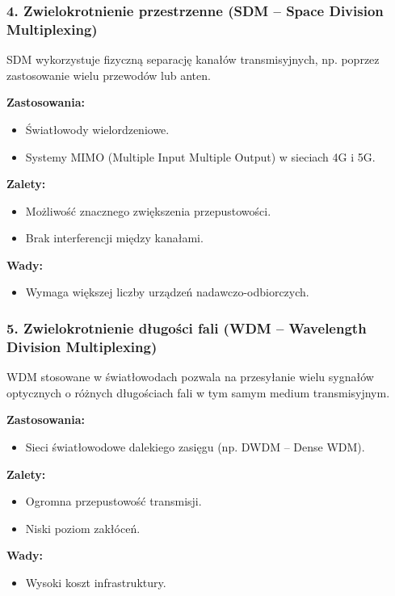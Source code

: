 \subsubsection{4. Zwielokrotnienie przestrzenne (SDM – Space Division Multiplexing)}
SDM wykorzystuje fizyczną separację kanałów transmisyjnych, np. poprzez zastosowanie wielu przewodów lub anten.

\textbf{Zastosowania:}
\begin{itemize}
    \item Światłowody wielordzeniowe.
    \item Systemy MIMO (Multiple Input Multiple Output) w sieciach 4G i 5G.
\end{itemize}

\textbf{Zalety:}
\begin{itemize}
    \item Możliwość znacznego zwiększenia przepustowości.
    \item Brak interferencji między kanałami.
\end{itemize}

\textbf{Wady:}
\begin{itemize}
    \item Wymaga większej liczby urządzeń nadawczo-odbiorczych.
\end{itemize}

\subsubsection{5. Zwielokrotnienie długości fali (WDM – Wavelength Division Multiplexing)}
WDM stosowane w światłowodach pozwala na przesyłanie wielu sygnałów optycznych o różnych długościach fali w tym samym medium transmisyjnym.

\textbf{Zastosowania:}
\begin{itemize}
    \item Sieci światłowodowe dalekiego zasięgu (np. DWDM – Dense WDM).
\end{itemize}

\textbf{Zalety:}
\begin{itemize}
    \item Ogromna przepustowość transmisji.
    \item Niski poziom zakłóceń.
\end{itemize}

\textbf{Wady:}
\begin{itemize}
    \item Wysoki koszt infrastruktury.
\end{itemize}

